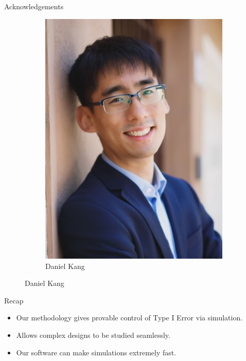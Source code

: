 \begin{frame}{Acknowledgements}
\begin{figure}
\begin{subfigure}[b]{0.3\textwidth}
        \includegraphics[width=\textwidth]{figures/daniel-kang.jpeg}
        \caption{Daniel Kang}
    \end{subfigure}
\end{figure}
\end{frame}

\begin{frame}{Recap}
\begin{itemize}
    \item Our methodology gives provable control of Type I Error via simulation.
    \item Allows complex designs to be studied seamlessly.
    \item Our software can make simulations extremely fast.
\end{itemize}
\end{frame}
